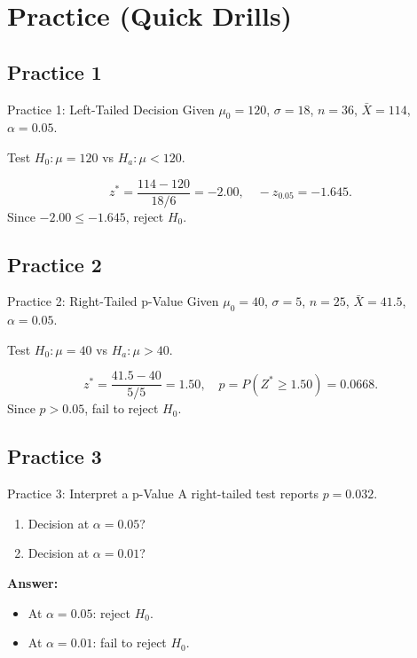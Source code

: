 \documentclass[aspectratio=169]{beamer}
\begin{document}
\section{Practice (Quick Drills)}

\subsection{Practice 1}
\begin{frame}{Practice 1: Left-Tailed Decision}
  Given \(\mu_0=120\), \(\sigma=18\), \(n=36\), \(\bar X=114\), \(\alpha=0.05\).

  Test \(H_0:\mu=120\) vs \(H_a:\mu<120\).

  \pause
  \[
    z^*=\frac{114-120}{18/6}=-2.00,
    \quad
    -z_{0.05}=-1.645.
  \]
  Since \(-2.00\le -1.645\), reject \(H_0\).
\end{frame}

\subsection{Practice 2}
\begin{frame}{Practice 2: Right-Tailed p-Value}
  Given \(\mu_0=40\), \(\sigma=5\), \(n=25\), \(\bar X=41.5\), \(\alpha=0.05\).

  Test \(H_0:\mu=40\) vs \(H_a:\mu>40\).

  \pause
  \[
    z^*=\frac{41.5-40}{5/5}=1.50,
    \quad
    p=P(Z^*\ge 1.50)=0.0668.
  \]
  Since \(p>0.05\), fail to reject \(H_0\).
\end{frame}

\subsection{Practice 3}
\begin{frame}{Practice 3: Interpret a p-Value}
  A right-tailed test reports \(p=0.032\).

  \begin{enumerate}
    \item Decision at \(\alpha=0.05\)?
    \item Decision at \(\alpha=0.01\)?
  \end{enumerate}

  \pause
  \textbf{Answer:}
  \begin{itemize}
    \item At \(\alpha=0.05\): reject \(H_0\).
    \item At \(\alpha=0.01\): fail to reject \(H_0\).
  \end{itemize}
\end{frame}
\end{document}
